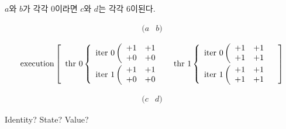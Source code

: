 \begin{frame}
$a$와 $b$가 각각 $0$이라면 $c$와 $d$는 각각 $6$이된다.

\[
\begin{array}{ll}
(a & b)
\end{array}
\]

\[
\textrm{execution}\left[
\begin{array}{ll}
  \textrm{thr 0}\left\{
  \begin{array}{l}
    \textrm{iter 0}\left(
    \begin{array}{ll}
    +1 & +1 \\
    +0 & +0 
    \end{array}
    \right.\\[2ex]
    \textrm{iter 1}\left(
    \begin{array}{ll}
    +1 & +1 \\
    +0 & +0 
    \end{array}
    \right.
  \end{array}
  \right.
& 
  \textrm{thr 1}\left\{
  \begin{array}{l}
    \textrm{iter 0}\left(
    \begin{array}{ll}
    +1 & +1 \\
    +1 & +1 
    \end{array}
    \right.\\[2ex]
    \textrm{iter 1}\left(
    \begin{array}{ll}
    +1 & +1 \\
    +1 & +1 
    \end{array}
    \right.
  \end{array}
  \right.
\end{array}
\right]
\]

\[
\begin{array}{ll}
(c & d)
\end{array}
\]

Identity? State? Value?

\end{frame}
